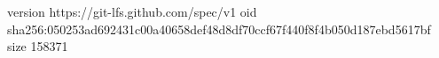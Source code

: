 version https://git-lfs.github.com/spec/v1
oid sha256:050253ad692431c00a40658def48d8df70ccf67f440f8f4b050d187ebd5617bf
size 158371
